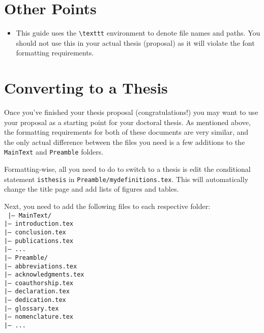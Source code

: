 \section{Other Points}

\begin{itemize}
    \item This guide uses the \texttt{\textbackslash texttt} environment to denote file
        names and paths. You should not use this in your actual thesis (proposal)
        as it will violate the font formatting requirements.
\end{itemize}

\section{Converting to a Thesis}

Once you've finished your thesis proposal (congratulations!) you may want
to use your proposal as a starting point for your doctoral thesis. As
mentioned above, the formatting requirements for both of these documents
are very similar, and the only actual difference between the files you need
is a few additions to the \texttt{MainText} and \texttt{Preamble} folders.

Formatting-wise, all you need to do to switch to a thesis is edit the
conditional statement \texttt{isthesis} in \texttt{Preamble/mydefinitions.tex}.
This will automatically change the title page and add lists of figures
and tables.

Next, you need to add the following files to each respective folder:
\\
\texttt{
|--- MainText/ \\ 
\hspace*{0.5cm}|--- introduction.tex\\
\hspace*{0.5cm}|--- conclusion.tex\\
\hspace*{0.5cm}|--- publications.tex\\
\hspace*{0.5cm}|--- ...\\
|--- Preamble/ \\ 
\hspace*{0.5cm}|--- abbreviations.tex\\
\hspace*{0.5cm}|--- acknowledgments.tex\\
\hspace*{0.5cm}|--- coauthorship.tex\\
\hspace*{0.5cm}|--- declaration.tex\\
\hspace*{0.5cm}|--- dedication.tex\\
\hspace*{0.5cm}|--- glossary.tex\\
\hspace*{0.5cm}|--- nomenclature.tex\\
\hspace*{0.5cm}|--- ...\\
}

